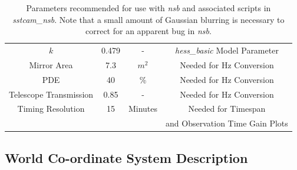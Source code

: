 \begin{table}
{\begin{tabular}{c|c|c|c}
         $k$ & 0.479 & - & \textit{hess\_basic} Model Parameter \\
         Mirror Area & 7.3 & $m^2$ & Needed for Hz Conversion\\
         PDE & 40 & \% & Needed for Hz Conversion\\
         Telescope Transmission &0.85 & - & Needed for Hz Conversion\\
         Timing Resolution & 15 & Minutes & Needed for Timespan \\&&&and Observation Time Gain Plots\\ 
    \end{tabular}
    }
    \caption{Parameters recommended for use with \textit{nsb} and associated scripts in \textit{sstcam\_nsb}. Note that a small amount of Gaussian blurring is necessary to correct for an apparent bug in \textit{nsb}.}
    \label{tab:params}
\end{table}



\subsection{World Co-ordinate System Description}

